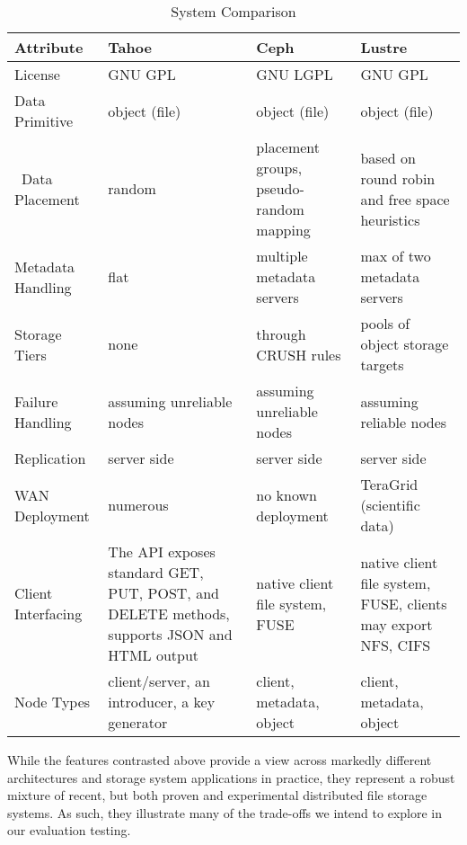 \documentclass[11pt]{article}
\begin{document}
\begin{table}
  \begin{center}
    \begin{tabular}{
        | p{} | p{} | p{} | p{} |
      }
      \hline
      Attribute & Tahoe & Ceph & Lustre \\ \hline
      License & GNU GPL & GNU LGPL & GNU GPL \\ \hline
      Data Primitive & object (file) & object (file) &
      object (file) \\ \hline\
      Data Placement & random & placement groups, pseudo-random mapping &   
      based on round robin and free space heuristics \\ \hline
      Metadata Handling & flat & multiple metadata servers & 
      max of two  metadata servers  \\ \hline
      Storage Tiers & none & through CRUSH rules & pools of object storage
      targets \\ \hline
      Failure Handling & assuming unreliable nodes & assuming unreliable
      nodes & assuming reliable nodes \\ \hline
      Replication & server side & server side & server side \\ \hline
      WAN Deployment & numerous & no known deployment & TeraGrid (scientific
      data) \\ \hline
      Client Interfacing &  The API exposes standard GET, PUT, POST, and
      DELETE methods, supports JSON and HTML output & native client file
      system, FUSE & native client file system, FUSE, clients may export
      NFS, CIFS \\ \hline
      Node Types & client/server, an introducer, a key generator & client,
      metadata, object & client, metadata, object \\ \hline
    \end{tabular}
    \caption{System Comparison}
    \label{tbl:syscomp}
  \end{center}
\end{table}

While the features contrasted above provide a view across markedly different 
architectures and storage system applications in practice, they represent a 
robust mixture of recent, but both proven and experimental distributed file 
storage systems. As such, they illustrate many of the trade-offs we intend 
to explore in our evaluation testing.
\end{document}
